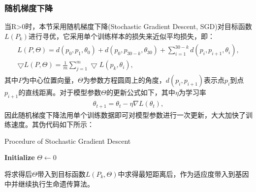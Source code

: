 \documentclass{whutmod}
\begin{document}
	\subsubsection{随机梯度下降}	
    	 当R>0时，本节采用随机梯度下降(Stochastic Gradient Descent, SGD)对目标函数$L(P_k)$进行寻优，它采用单个训练样本的损失来近似平均损失，即：
    	 	    \begin{gather}
    	 \begin{matrix}
    	 L(P,\Theta)=d(p_0,p_{1},\theta_0)+d(p_0,p_{30-k},\theta_{30})+\sum_{i=1}^{30-k}d(p_i,p_{i+1},\theta_{i}) ,\\ 
    	 \bigtriangledown  L(P,\Theta)= \frac{1}{m}\sum_{j=1}^{m}\bigtriangledown L(p_k,\theta_{i}),
    	 \end{matrix}
    	 \end{gather}
    	 其中$P$为中心位置向量，$\Theta$为参数方程圆周上的角度，$d(p_i,p_{i+1})$表示点$p_i$到点$p_{i+1}$的直线距离。对于模型参数$\Theta$的更新公式如下，其中$\eta$为学习率
    	 \begin{gather}
			\theta_{t+1}=\theta_{t}-\eta \nabla L\left(\theta_{t}\right),
    	 \end{gather}
    	 因此随机梯度下降法用单个训练数据即可对模型参数进行一次更新，大大加快了训练速度。其伪代码如下所示：
    	 
    	   	\begin{algorithm}[H]
    	 	\caption{Procedure of Stochastic Gradient Descent}
    	 	\LinesNumbered
    	 	\textbf{Initialize} $\Theta \leftarrow 0$ \newline
    	 	\Return {$\Theta$ }
    	 \end{algorithm}
		
		将求得后$\Theta$带入到目标函数$L(P_k, \Theta)$中求得最短距离后，作为适应度带入到基因中并继续执行生命遗传算法。	
\end{document}
